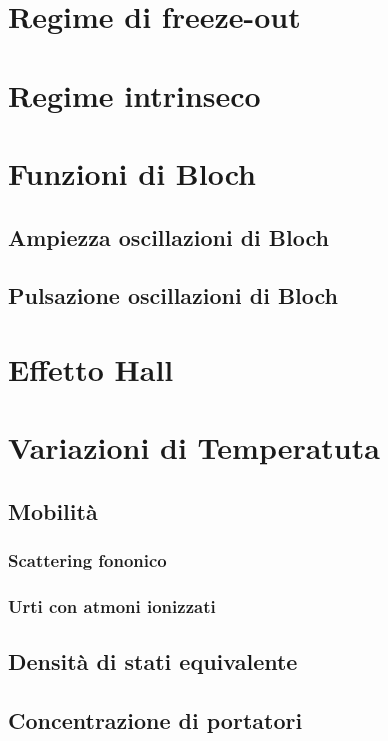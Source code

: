 \documentclass[10pt,a4paper]{report}
\begin{document}
\chapter{Regime di freeze-out}

\chapter{Regime intrinseco}

\chapter{Funzioni di Bloch}

	\section{Ampiezza oscillazioni di Bloch}

	\section{Pulsazione oscillazioni di Bloch}

\chapter{Effetto Hall}

\chapter{Variazioni di Temperatuta}

	\section{Mobilità}

		\subsection{Scattering fononico}

		\subsection{Urti con atmoni ionizzati}

	\section{Densità di stati equivalente}

	\section{Concentrazione di portatori}
\end{document}
